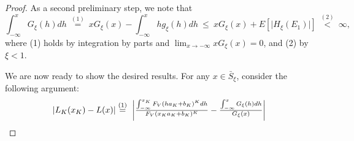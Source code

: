 \begin{proof}
As a second preliminary step, we note that
\begin{equation}
\int_{-\infty }^{x}G_{\xi }(h) dh~ \overset{(1)}{=}~
xG_{\xi }( x) -\int_{-\infty }^{x}hg_{\xi }(h) dh~\leq~ xG_{\xi }( x) +E[ \vert H_{\xi }(E_{1})\vert ] ~ \overset{(2)}{<}~\infty ,
\label{eq:L4}
\end{equation}
where (1) holds by integration by parts and $\lim_{x\to -\infty }xG_{\xi }( x) =0$, and (2) by $\xi <1$.

We are now ready to show the desired results. For any $x\in \bar{S}_{\xi}$, consider the following argument:
\begin{align}
\vert L_{K}( x_{K}) -L( x) \vert 
&\overset{(1)}{=}~\bigg\vert \tfrac{\int_{-\infty }^{x_{K}}{F_{V}(ha_{K}+b_{K})^{K}}dh}{ F_{V}( x_{K}a_{K}+b_{K}) ^{K}}-\tfrac{\int_{-\infty }^{x}G_{\xi }(h) dh}{G_{\xi }( x) }\bigg\vert \notag \\

\end{align}
\end{proof}
